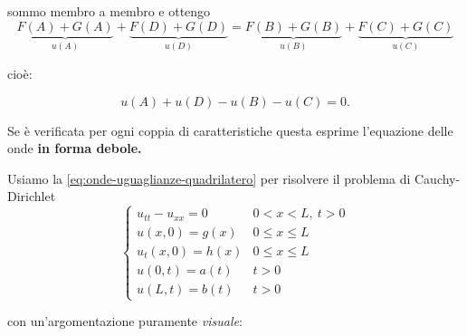 \begin{enumerate}
          sommo membro a membro e ottengo
          \begin{equation*}
              \underbrace{F(A) +G(A)}_{u(A)} +\underbrace{F(D) +G(D)}_{u(D)} =\underbrace{F(B) +G(B)}_{u(B)} +\underbrace{F(C) +G(C)}_{u(C)}
          \end{equation*}

          cioè:

          \begin{equation}
              u(A) +u(D) -u(B) -u(C) =0.
              \label{eq:onde-uguaglianze-quadrilatero}
          \end{equation}

          Se è verificata per ogni coppia di caratteristiche questa esprime l'equazione delle onde \textbf{in forma debole.}

          Usiamo la \eqref{eq:onde-uguaglianze-quadrilatero} per risolvere il problema di Cauchy-Dirichlet
          \begin{equation*}
              \begin{cases}
                  u_{tt} -u_{xx} =0 & 0< x< L,\ t >0          \\
                  u(x,0) =g(x)      & 0\leq x\leq L \\
                  u_{t}(x,0) =h(x)  & 0\leq x\leq L \\
                  u(0,t) =a(t)      & t >0                    \\
                  u(L,t) =b(t)      & t >0
              \end{cases}
          \end{equation*}

          con un'argomentazione puramente \textit{visuale}:

          \begin{figure}[htpb]
              \centering

              \begin{tikzpicture}[x=0.75pt,y=0.75pt,yscale=-1,xscale=1]


\end{tikzpicture}
\end{figure}
\end{enumerate}
